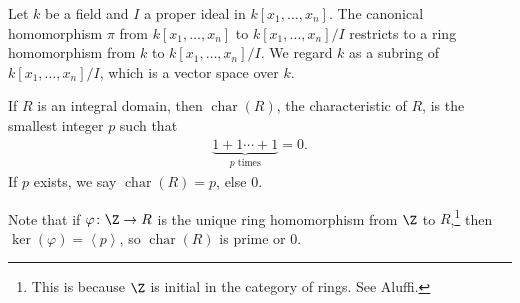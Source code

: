 \documentclass[10pt]{mypackage}
\begin{document}
Let $k$ be a field and $I$ a proper ideal in $k\left[x_1,\dots,x_n\right]$. The canonical homomorphism $\pi$ from $k\left[x_1,\dots,x_n\right]$ to $k\left[x_1,\dots,x_n\right]/I$ restricts to a ring homomorphism from $k$ to $k\left[x_1,\dots,x_n\right]/I$. We regard $k$ as a subring of $k\left[x_1,\dots,x_n\right]/I$, which is a vector space over $k$.\newline

If $R$ is an integral domain, then $\operatorname{char}\left(R\right)$, the characteristic of $R$, is the smallest integer $p$ such that 
\begin{align*}
  \underbrace{1+1\cdots +1}_{p\text{ times}} = 0. 
\end{align*}
If $p$ exists, we say $\operatorname{char}\left(R\right) = p$, else $0$.\newline

Note that if $\varphi\colon \Z\rightarrow R$ is the unique ring homomorphism from $\Z$ to $R$,\footnote{This is because $\Z$ is initial in the category of rings. See Aluffi.} then $\ker\left(\varphi\right) = \left\langle p \right\rangle$, so $\operatorname{char}\left(R\right)$ is prime or $0$.\newline
\end{document}
